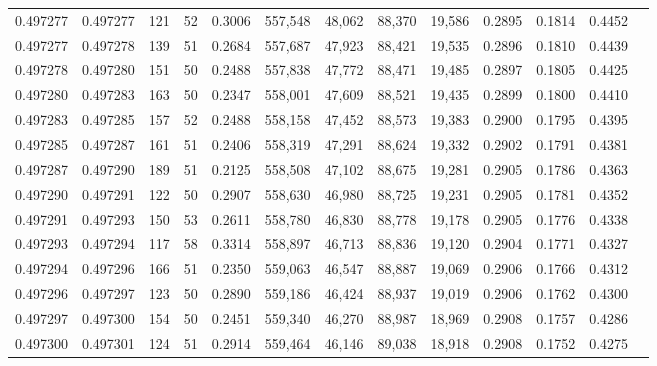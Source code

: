 \begin{tabular}{rrrrrrrrrrrrr}
0.497277 & 0.497277 &   121 &  52 &                                     0.3006 & 557,548 &  48,062 &  88,370 &  19,586 & 0.2895 & 0.1814 & 0.4452 \\
0.497277 & 0.497278 &   139 &  51 &                                     0.2684 & 557,687 &  47,923 &  88,421 &  19,535 & 0.2896 & 0.1810 & 0.4439 \\
0.497278 & 0.497280 &   151 &  50 &                                     0.2488 & 557,838 &  47,772 &  88,471 &  19,485 & 0.2897 & 0.1805 & 0.4425 \\
0.497280 & 0.497283 &   163 &  50 &                                     0.2347 & 558,001 &  47,609 &  88,521 &  19,435 & 0.2899 & 0.1800 & 0.4410 \\
0.497283 & 0.497285 &   157 &  52 &                                     0.2488 & 558,158 &  47,452 &  88,573 &  19,383 & 0.2900 & 0.1795 & 0.4395 \\
0.497285 & 0.497287 &   161 &  51 &                                     0.2406 & 558,319 &  47,291 &  88,624 &  19,332 & 0.2902 & 0.1791 & 0.4381 \\
0.497287 & 0.497290 &   189 &  51 &                                     0.2125 & 558,508 &  47,102 &  88,675 &  19,281 & 0.2905 & 0.1786 & 0.4363 \\
0.497290 & 0.497291 &   122 &  50 &                                     0.2907 & 558,630 &  46,980 &  88,725 &  19,231 & 0.2905 & 0.1781 & 0.4352 \\
0.497291 & 0.497293 &   150 &  53 &                                     0.2611 & 558,780 &  46,830 &  88,778 &  19,178 & 0.2905 & 0.1776 & 0.4338 \\
0.497293 & 0.497294 &   117 &  58 &                                     0.3314 & 558,897 &  46,713 &  88,836 &  19,120 & 0.2904 & 0.1771 & 0.4327 \\
0.497294 & 0.497296 &   166 &  51 &                                     0.2350 & 559,063 &  46,547 &  88,887 &  19,069 & 0.2906 & 0.1766 & 0.4312 \\
0.497296 & 0.497297 &   123 &  50 &                                     0.2890 & 559,186 &  46,424 &  88,937 &  19,019 & 0.2906 & 0.1762 & 0.4300 \\
0.497297 & 0.497300 &   154 &  50 &                                     0.2451 & 559,340 &  46,270 &  88,987 &  18,969 & 0.2908 & 0.1757 & 0.4286 \\
0.497300 & 0.497301 &   124 &  51 &                                     0.2914 & 559,464 &  46,146 &  89,038 &  18,918 & 0.2908 & 0.1752 & 0.4275 \\

\end{tabular}
